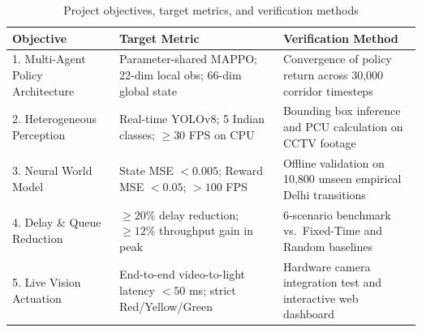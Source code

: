 \begin{table}[htbp]
\centering
\small
\caption{Project objectives, target metrics, and verification methods}
\label{tab:objectives_mapping}
\begin{tabularx}{\textwidth}{|p{3.8cm}|p{4.8cm}|X|}
\hline
\textbf{Objective} & \textbf{Target Metric} & \textbf{Verification Method} \\ \hline
1. Multi-Agent Policy Architecture & Parameter-shared MAPPO; 22-dim local obs; 66-dim global state & Convergence of policy return across 30,000 corridor timesteps \\ \hline
2. Heterogeneous Perception & Real-time YOLOv8; 5 Indian classes; $\ge 30$ FPS on CPU & Bounding box inference and PCU calculation on CCTV footage \\ \hline
3. Neural World Model & State MSE $< 0.005$; Reward MSE $< 0.05$; $> 100$ FPS & Offline validation on 10,800 unseen empirical Delhi transitions \\ \hline
4. Delay \& Queue Reduction & $\ge 20\%$ delay reduction; $\ge 12\%$ throughput gain in peak & 6-scenario benchmark vs.\ Fixed-Time and Random baselines \\ \hline
5. Live Vision Actuation & End-to-end video-to-light latency $< 50$ ms; strict Red/Yellow/Green & Hardware camera integration test and interactive web dashboard \\ \hline
\end{tabularx}
\end{table}


